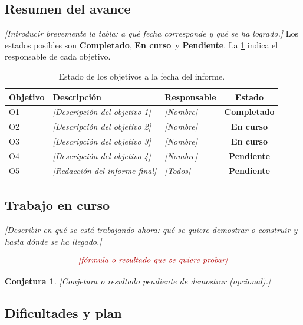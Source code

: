 \documentclass[11pt,letterpaper]{article}
\theoremstyle{plain}
\newtheorem{conjecture}[theorem]{Conjetura}
\theoremstyle{definition}
\theoremstyle{remark}
\numberwithin{equation}{section}
\newcommand{\ph}[1]{\textcolor{red!70!black}{\textit{[#1]}}}
\newcommand{\done}{\textcolor{green!45!black}{\textbf{Completado}}}
\newcommand{\wip}{\textcolor{orange!80!black}{\textbf{En curso}}}
\newcommand{\todo}{\textcolor{red!70!black}{\textbf{Pendiente}}}
\begin{document}
	\subsection{Resumen del avance}
	
	\ph{Introducir brevemente la tabla: a qué fecha corresponde y qué se ha logrado.} Los estados posibles son \done, \wip\ y \todo. La \cref{tab:estado} indica el responsable de cada objetivo.
	
	\begin{table}[ht]
		\centering
		\renewcommand{\arraystretch}{1.25}
		\begin{tabular}{@{}l p{5.6cm} l c@{}}
			\toprule
			\textbf{Objetivo} & \textbf{Descripción} & \textbf{Responsable} & \textbf{Estado} \\
			\midrule
			O1 & \ph{Descripción del objetivo 1} & \ph{Nombre} & \done \\
			O2 & \ph{Descripción del objetivo 2} & \ph{Nombre} & \wip \\
			O3 & \ph{Descripción del objetivo 3} & \ph{Nombre} & \wip \\
			O4 & \ph{Descripción del objetivo 4} & \ph{Nombre} & \todo \\
			O5 & \ph{Redacción del informe final} & \ph{Todos} & \todo \\
			\bottomrule
		\end{tabular}
		\caption{Estado de los objetivos a la fecha del informe.}\label{tab:estado}
	\end{table}
	
	\subsection{Trabajo en curso}
	
	\ph{Describir en qué se está trabajando ahora: qué se quiere demostrar o construir y hasta dónde se ha llegado.}
	
	\begin{equation}\label{eq:pendiente}
		\ph{fórmula o resultado que se quiere probar}
	\end{equation}
	
	\begin{conjecture}\label{conj:pendiente}
		\ph{Conjetura o resultado pendiente de demostrar (opcional).}
	\end{conjecture}
	
	\subsection{Dificultades y plan}
	
\end{document}
